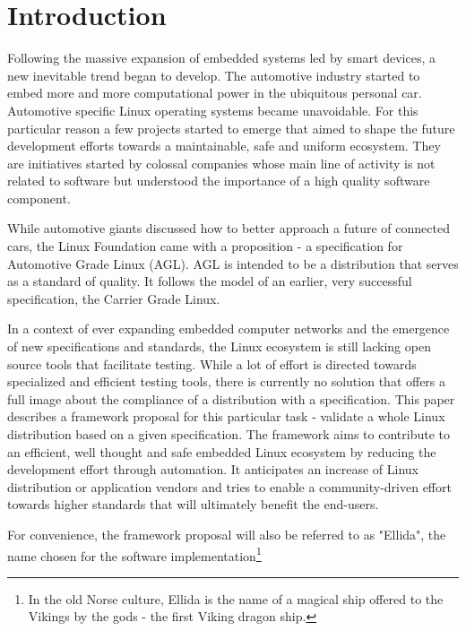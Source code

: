 \chapter{Introduction}

Following the massive expansion of embedded systems led by smart devices, a new inevitable trend began to develop. The automotive industry started to embed more and more computational power in the ubiquitous personal car. Automotive specific Linux operating systems  became unavoidable. For this particular reason a few projects started to emerge that aimed to shape the future development efforts towards a maintainable, safe and uniform ecosystem. They are initiatives started by colossal companies whose main line of activity is not related to software but understood the importance of a high quality software component.

While automotive giants discussed how to better approach a future of connected cars, the Linux Foundation came with a proposition - a specification for Automotive Grade Linux (AGL). AGL is intended to be a distribution that serves as a standard of quality. It follows the model of an earlier, very successful specification, the Carrier Grade Linux.

In a context of ever expanding embedded computer networks and the emergence of new specifications and standards, the Linux ecosystem is still lacking open source tools that facilitate testing. While a lot of effort is directed towards specialized and efficient testing tools, there is currently no solution that offers a full image about the compliance of a distribution with a specification. This paper describes a framework proposal for this particular task - validate a whole Linux distribution based on a given specification. The framework aims to contribute to an efficient, well thought and safe embedded Linux ecosystem by reducing the development effort through automation. It anticipates an increase of Linux distribution or application vendors and tries to enable a community-driven effort towards higher standards that will ultimately benefit the end-users.

For convenience, the framework proposal will also be referred to as "Ellida", the name chosen for the software implementation\footnote{In the old Norse culture, Ellida is the name of a magical ship offered to the Vikings by the gods - the first Viking dragon ship.}

